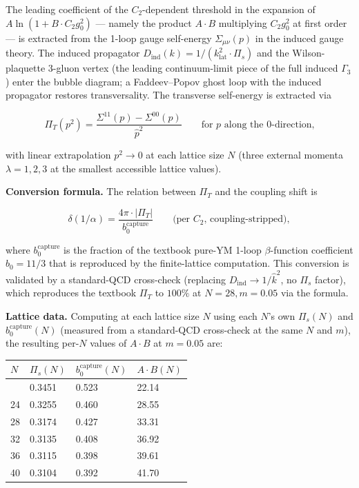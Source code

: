 \documentclass[
]{article}
\begin{document}
The leading coefficient of the \(C_2\)-dependent threshold in the
expansion of \(A \ln(1 + B \cdot C_2 g_0^2)\) --- namely the product
\(A \cdot B\) multiplying \(C_2 g_0^2\) at first order --- is extracted
from the 1-loop gauge self-energy \(\Sigma_{\mu\nu}(p)\) in the induced
gauge theory. The induced propagator
\(D_{\text{ind}}(k) = 1/(k^2_{\text{lat}} \cdot \Pi_s)\) and the
Wilson-plaquette 3-gluon vertex (the leading continuum-limit piece of
the full induced \(\Gamma_3\)) enter the bubble diagram; a
Faddeev--Popov ghost loop with the induced propagator restores
transversality. The transverse self-energy is extracted via

\[\Pi_T(p^2) = \frac{\Sigma^{11}(p) - \Sigma^{00}(p)}{\hat{p}^2} \qquad \text{for } p \text{ along the 0-direction,}\]

with linear extrapolation \(p^2 \to 0\) at each lattice size \(N\)
(three external momenta \(\lambda = 1, 2, 3\) at the smallest accessible
lattice values).

\textbf{Conversion formula.} The relation between \(\Pi_T\) and the
coupling shift is

\[\delta(1/\alpha) = \frac{4\pi \cdot |\Pi_T|}{b_0^{\text{capture}}} \qquad \text{(per } C_2\text{, coupling-stripped)},\]

where \(b_0^{\text{capture}}\) is the fraction of the textbook pure-YM
1-loop \(\beta\)-function coefficient \(b_0 = 11/3\) that is reproduced
by the finite-lattice computation. This conversion is validated by a
standard-QCD cross-check (replacing \(D_{\text{ind}} \to 1/\hat{k}^2\),
no \(\Pi_s\) factor), which reproduces the textbook \(\Pi_T\) to
\(100\%\) at \(N = 28, m = 0.05\) via the formula.

\textbf{Lattice data.} Computing at each lattice size \(N\) using each
\(N\)'s own \(\Pi_s(N)\) and \(b_0^{\text{capture}}(N)\) (measured from
a standard-QCD cross-check at the same \(N\) and \(m\)), the resulting
per-\(N\) values of \(A \cdot B\) at \(m = 0.05\) are:

\begin{longtable}[]{@{}llll@{}}
\toprule\noalign{}
\(N\) & \(\Pi_s(N)\) & \(b_0^{\text{capture}}(N)\) & \(A \cdot B(N)\) \\
\midrule\noalign{}
\endhead
\bottomrule\noalign{}
\endlastfoot
20 & 0.3451 & 0.523 & 22.14 \\
24 & 0.3255 & 0.460 & 28.55 \\
28 & 0.3174 & 0.427 & 33.31 \\
32 & 0.3135 & 0.408 & 36.92 \\
36 & 0.3115 & 0.398 & 39.61 \\
40 & 0.3104 & 0.392 & 41.70 \\
\end{longtable}
\end{document}
